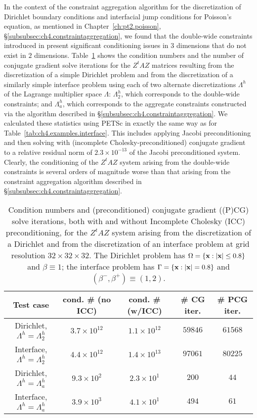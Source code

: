 In the context of the constraint aggregation algorithm for the discretization of Dirichlet boundary conditions and interfacial jump conditions for Poisson's equation, as mentioned in Chapter~\ref{ch:pt2.poisson}, \S\ref{subsubsec:ch4.constraintaggregation}, we found that the double-wide constraints introduced in \cite{Bedrossian10} present significant conditioning issues in $3$ dimensions that do not exist in $2$ dimensions. Table~\ref{tab:pt2.constraintconditioning} shows the condition numbers and the number of conjugate gradient solve iterations for the $Z^tAZ$ matrices resulting from the discretization of a simple Dirichlet problem and from the discretization of a similarly simple interface problem using each of two alternate discretizations $\Lambda^h$ of the Lagrange multiplier space $\Lambda$: $\Lambda^h_2$, which corresponds to the double-wide constraints; and $\Lambda^h_a$, which corresponds to the aggregate constraints constructed via the algorithm described in \S\ref{subsubsec:ch4.constraintaggregation}. We calculated these statistics using PETSc in exactly the same way as for Table~\ref{tab:ch4.examples.interface}. This includes applying Jacobi preconditioning and then solving with (incomplete Cholesky-preconditioned) conjugate gradient to a relative residual norm of $2.3 \times 10^{-13}$ of the Jacobi preconditioned system. Clearly, the conditioning of the $Z^tAZ$ system arising from the double-wide constraints is several orders of magnitude worse than that arising from the constraint aggregation algorithm described in \S\ref{subsubsec:ch4.constraintaggregation}.

\begin{table}[htbp]
\centering
\begin{tabular}{|c|c|c|c|c|}
\hline
Test case & cond. \# (no ICC) & cond. \# (w/ICC) & \# CG iter. & \# PCG iter. \\
\hline
Dirichlet, $\Lambda^h = \Lambda^h_2$ & $3.7 \times 10^{12}$ & $1.1 \times 10^{12}$ & $59846$ & $61568$ \\
Interface, $\Lambda^h = \Lambda^h_2$ & $4.4 \times 10^{12}$ & $1.4 \times 10^{13}$ & $97061$ & $80225$ \\
Dirichlet, $\Lambda^h = \Lambda^h_a$ & $9.3 \times 10^{ 2}$ & $2.3 \times 10^{ 1}$ &   $200$ &    $44$ \\
Interface, $\Lambda^h = \Lambda^h_a$ & $3.9 \times 10^{ 3}$ & $4.1 \times 10^{ 1}$ &   $494$ &    $61$ \\
\hline
\end{tabular}
\caption{Condition numbers and (preconditioned) conjugate gradient ((P)CG) solve iterations, both with and without Incomplete Cholesky (ICC) preconditioning, for the $Z^tAZ$ system arising from the discretization of a Dirichlet and from the discretization of an interface problem at grid resolution $32 \times 32 \times 32$. The Dirichlet problem has $\Omega = \{\mathbf{x} : \left\lvert \mathbf{x} \right\rvert \leq 0.8\}$ and $\beta \equiv 1$; the interface problem has $\Gamma = \{\mathbf{x} : \left\lvert \mathbf{x} \right\rvert = 0.8\}$ and $(\beta^-, \beta^+) \equiv (1, 2)$.}
\label{tab:pt2.constraintconditioning}
\end{table}
